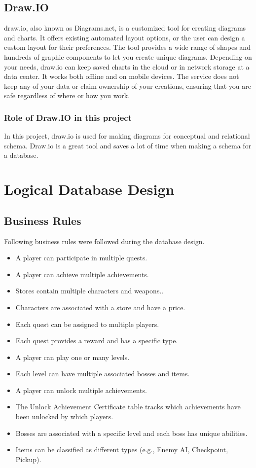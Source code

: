 \documentclass[12pt]{report}
\begin{document}
\section{Draw.IO}
draw.io, also known as Diagrams.net, is a customized tool for creating diagrams and charts. It offers existing automated layout options, or the user can design a custom layout for their preferences. The tool provides a wide range of shapes and hundreds of graphic components to let you create unique diagrams. Depending on your needs, draw.io can keep saved charts in the cloud or in network storage at a data center. It works both offline and on mobile devices. The service does not keep any of your data or claim ownership of your creations, ensuring that you are safe regardless of where or how you work\cite{drawio_ref}.

\subsection{Role of Draw.IO in this project}
In this project, draw.io is used for making diagrams for conceptual and relational schema. Draw.io is a great tool and saves a lot of time when making a schema for a database.

\chapter{Logical Database Design}

\section{Business Rules}
Following business rules were followed during the database design.

\begin{itemize}
    \item A player can participate in multiple quests.
		\item A player can achieve multiple achievements.
		\item Stores contain multiple characters and weapons..
    \item Characters are associated with a store and have a price.
  	\item Each quest can be assigned to multiple players.
	  \item Each quest provides a reward and has a specific type.
		\item A player can play one or many levels.
    \item Each level can have multiple associated bosses and items.
    \item A player can unlock multiple achievements.
		\item The Unlock Achievement Certificate table tracks which achievements have been unlocked by which players.		
		\item Bosses are associated with a specific level and each boss has unique abilities.
		\item Items can be classified as different types (e.g., Enemy AI, Checkpoint, Pickup).
		
\end{itemize}
\end{document}
